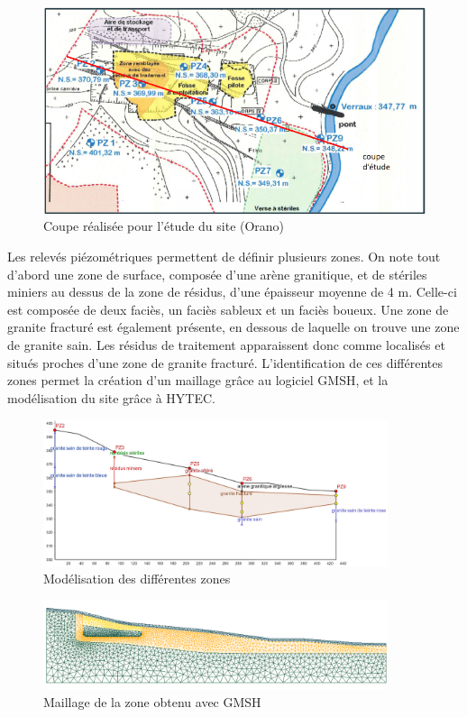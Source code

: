 \documentclass{article}
\begin{document}
\begin{figure}[H]
    \centering
    \includegraphics[width=0.8\linewidth]{III_B_3_1.png}
    \caption{Coupe réalisée pour l'étude du site (Orano)}
    \label{fig:coupe_ribiere}
\end{figure}



Les relevés piézométriques permettent de définir plusieurs zones. On note tout d’abord une zone de surface, composée d’une arène granitique, et de stériles miniers au dessus de la zone de résidus, d’une épaisseur moyenne de 4 m. Celle-ci est composée de deux faciès, un faciès sableux et un faciès boueux. Une zone de granite fracturé est également présente, en dessous de laquelle on trouve une zone de granite sain. Les résidus de traitement apparaissent donc comme localisés et situés proches d’une zone de granite fracturé. L’identification de ces différentes zones permet la création d’un maillage grâce au logiciel GMSH, et la modélisation du site grâce à HYTEC.

\begin{figure}[H]
    \centering
    \includegraphics[width = 0.9\textwidth]{III_B_3_2.jpg} 
    \caption{Modélisation des différentes zones}
    \label{fig:zones_ribieres_geogebra}
\end{figure}


\begin{figure}[H]
    \centering
        \includegraphics[width=0.9\textwidth]{III_B_3_3.png} 
        \caption{Maillage de la zone obtenu avec GMSH}
        \label{maillage_ribiere}
\end{figure}
\end{document}
